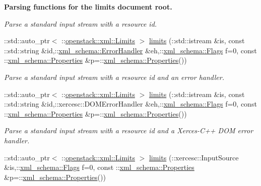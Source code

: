 \begin{Indent}{\bf Parsing functions for the limits document root.}
\begin{DoxyCompactItemize}
\begin{DoxyCompactList}\small\item\em Parse a standard input stream with a resource id. \item\end{DoxyCompactList}\item 
::std::auto\_\-ptr$<$ ::\hyperlink{classopenstack_1_1xml_1_1Limits}{openstack::xml::Limits} $>$ \hyperlink{namespaceopenstack_1_1xml_af5e9ea7a06ea4785265393835f324487}{limits} (::std::istream \&is, const ::std::string \&id,::\hyperlink{namespacexml__schema_ab1c9361bfd3b404eaabf0c31eded79dc}{xml\_\-schema::ErrorHandler} \&eh,::\hyperlink{namespacexml__schema_affb4c227cbd9aa7453dd1dc5a1401943}{xml\_\-schema::Flags} f=0, const ::\hyperlink{namespacexml__schema_ad27ce19a7ee1d3b1064092648898f64c}{xml\_\-schema::Properties} \&p=::\hyperlink{namespacexml__schema_ad27ce19a7ee1d3b1064092648898f64c}{xml\_\-schema::Properties}())
\begin{DoxyCompactList}\small\item\em Parse a standard input stream with a resource id and an error handler. \item\end{DoxyCompactList}\item 
::std::auto\_\-ptr$<$ ::\hyperlink{classopenstack_1_1xml_1_1Limits}{openstack::xml::Limits} $>$ \hyperlink{namespaceopenstack_1_1xml_a879a0568063543f354c3d74e371d14ad}{limits} (::std::istream \&is, const ::std::string \&id,::xercesc::DOMErrorHandler \&eh,::\hyperlink{namespacexml__schema_affb4c227cbd9aa7453dd1dc5a1401943}{xml\_\-schema::Flags} f=0, const ::\hyperlink{namespacexml__schema_ad27ce19a7ee1d3b1064092648898f64c}{xml\_\-schema::Properties} \&p=::\hyperlink{namespacexml__schema_ad27ce19a7ee1d3b1064092648898f64c}{xml\_\-schema::Properties}())
\begin{DoxyCompactList}\small\item\em Parse a standard input stream with a resource id and a Xerces-\/C++ DOM error handler. \item\end{DoxyCompactList}\item 
::std::auto\_\-ptr$<$ ::\hyperlink{classopenstack_1_1xml_1_1Limits}{openstack::xml::Limits} $>$ \hyperlink{namespaceopenstack_1_1xml_abd4fbfbcd41d9d8091b6d66051811dd3}{limits} (::xercesc::InputSource \&is,::\hyperlink{namespacexml__schema_affb4c227cbd9aa7453dd1dc5a1401943}{xml\_\-schema::Flags} f=0, const ::\hyperlink{namespacexml__schema_ad27ce19a7ee1d3b1064092648898f64c}{xml\_\-schema::Properties} \&p=::\hyperlink{namespacexml__schema_ad27ce19a7ee1d3b1064092648898f64c}{xml\_\-schema::Properties}())

\end{DoxyCompactItemize}
\end{Indent}
